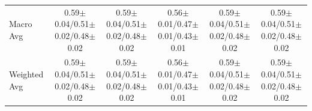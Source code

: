 \documentclass[10pt,a4paper,parskip=half-]{scrartcl}
\begin{document}
\begin{landscape}
\begin{table}[H]
{\begin{tabular}{l|cccc|cccc|cccc|cccc|cccc}
Macro Avg & \multicolumn{4}{c|}{0.59$\pm$0.04/0.51$\pm$0.02/0.48$\pm$0.02} & \multicolumn{4}{c|}{0.59$\pm$0.04/0.51$\pm$0.02/0.48$\pm$0.02} & \multicolumn{4}{c|}{0.56$\pm$0.01/0.47$\pm$0.01/0.43$\pm$0.01} & \multicolumn{4}{c|}{0.59$\pm$0.04/0.51$\pm$0.02/0.48$\pm$0.02} & \multicolumn{4}{c}{0.59$\pm$0.04/0.51$\pm$0.02/0.48$\pm$0.02} \\
Weighted Avg & \multicolumn{4}{c|}{0.59$\pm$0.04/0.51$\pm$0.02/0.48$\pm$0.02} & \multicolumn{4}{c|}{0.59$\pm$0.04/0.51$\pm$0.02/0.48$\pm$0.02} & \multicolumn{4}{c|}{0.56$\pm$0.01/0.47$\pm$0.01/0.43$\pm$0.01} & \multicolumn{4}{c|}{0.59$\pm$0.04/0.51$\pm$0.02/0.48$\pm$0.02} & \multicolumn{4}{c}{0.59$\pm$0.04/0.51$\pm$0.02/0.48$\pm$0.02} \\
\bottomrule
\end{tabular}}
\end{table}


\end{landscape}
\end{document}
